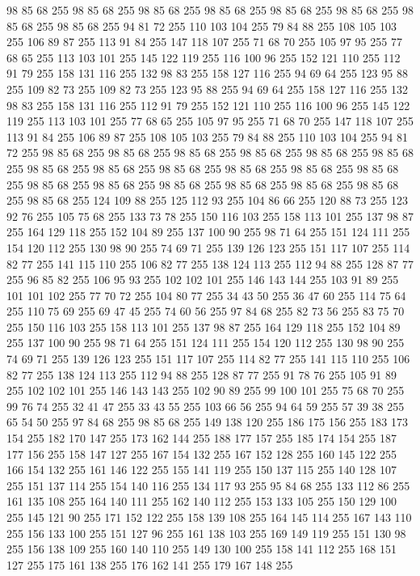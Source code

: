 98 85 68 255 98 85 68 255 98 85 68 255 98 85 68 255 98 85 68 255 98 85 68 255 98 85 68 255 98 85 68 255 94 81 72 255 110 103 104 255 79 84 88 255 108 105 103 255 106 89 87 255 113 91 84 255 147 118 107 255 71 68 70 255 105 97 95 255 77 68 65 255 113 103 101 255 145 122 119 255 116 100 96 255 152 121 110 255 112 91 79 255 158 131 116 255 132 98 83 255 158 127 116 255 94 69 64 255 123 95 88 255 109 82 73 255 109 82 73 255 123 95 88 255 94 69 64 255 158 127 116 255 132 98 83 255 158 131 116 255 112 91 79 255 152 121 110 255 116 100 96 255 145 122 119 255 113 103 101 255 77 68 65 255 105 97 95 255 71 68 70 255 147 118 107 255 113 91 84 255 106 89 87 255 108 105 103 255 79 84 88 255 110 103 104 255 94 81 72 255 98 85 68 255 98 85 68 255 98 85 68 255 98 85 68 255 98 85 68 255 98 85 68 255 98 85 68 255 98 85 68 255 98 85 68 255 98 85 68 255 98 85 68 255 98 85 68 255 98 85 68 255 98 85 68 255
98 85 68 255 98 85 68 255 98 85 68 255 98 85 68 255 98 85 68 255 124 109 88 255 125 112 93 255 104 86 66 255 120 88 73 255 123 92 76 255 105 75 68 255 133 73 78 255 150 116 103 255 158 113 101 255 137 98 87 255 164 129 118 255 152 104 89 255 137 100 90 255 98 71 64 255 151 124 111 255 154 120 112 255 130 98 90 255 74 69 71 255 139 126 123 255 151 117 107 255 114 82 77 255 141 115 110 255 106 82 77 255 138 124 113 255 112 94 88 255 128 87 77 255 96 85 82 255 106 95 93 255 102 102 101 255 146 143 144 255 103 91 89 255 101 101 102 255 77 70 72 255 104 80 77 255 34 43 50 255 36 47 60 255 114 75 64 255 110 75 69 255 69 47 45 255 74 60 56 255 97 84 68 255 82 73 56 255 83 75 70 255 150 116 103 255 158 113 101 255 137 98 87 255 164 129 118 255 152 104 89 255 137 100 90 255 98 71 64 255 151 124 111 255 154 120 112 255 130 98 90 255 74 69 71 255 139 126 123 255 151 117 107 255 114 82 77 255 141 115 110 255 106 82 77 255
138 124 113 255 112 94 88 255 128 87 77 255 91 78 76 255 105 91 89 255 102 102 101 255 146 143 143 255 102 90 89 255 99 100 101 255 75 68 70 255 99 76 74 255 32 41 47 255 33 43 55 255 103 66 56 255 94 64 59 255 57 39 38 255 65 54 50 255 97 84 68 255 98 85 68 255 149 138 120 255 186 175 156 255 183 173 154 255 182 170 147 255 173 162 144 255 188 177 157 255 185 174 154 255 187 177 156 255 158 147 127 255 167 154 132 255 167 152 128 255 160 145 122 255 166 154 132 255 161 146 122 255 155 141 119 255 150 137 115 255 140 128 107 255 151 137 114 255 154 140 116 255 134 117 93 255 95 84 68 255 133 112 86 255 161 135 108 255 164 140 111 255 162 140 112 255 153 133 105 255 150 129 100 255 145 121 90 255 171 152 122 255 158 139 108 255 164 145 114 255 167 143 110 255 156 133 100 255 151 127 96 255 161 138 103 255 169 149 119 255 151 130 98 255 156 138 109 255 160 140 110 255 149 130 100 255 158 141 112 255 168 151 127 255 175 161 138 255 176 162 141 255 179 167 148 255
